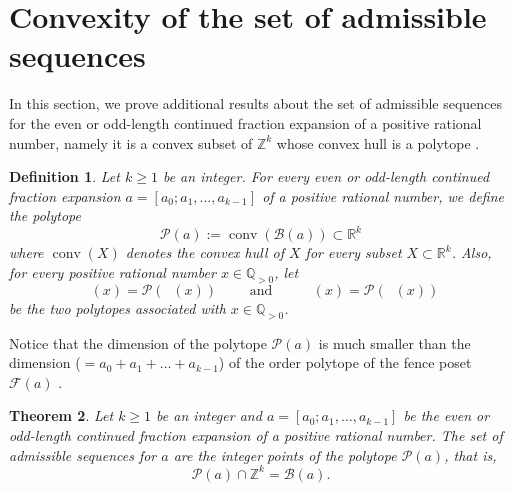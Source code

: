 \documentclass[a4paper,12pt]{amsart}
\newtheorem{definition}{Definition}[section]
\newtheorem{theorem}[definition]{Theorem}
\newcommand{\Z}{\mathbb{Z}}
\newcommand{\Q}{\mathbb{Q}}
\newcommand{\R}{\mathbb{R}}
\newcommand{\xx}{{x}}
\newcommand{\Bcal}{{\mathcal{B}}}
\newcommand{\Fcal}{{\mathcal{F}}}
\newcommand{\Pcal}{{\mathcal{P}}}
\newcommand{\0}{\mathtt{0}}
\newcommand{\1}{\mathtt{1}}
\newcommand{\2}{\mathtt{2}}
\newcommand{\3}{\mathtt{3}}
\DeclareMathOperator{\Pcaleven}{{\Pcal_{\text{even}}}}
\DeclareMathOperator{\Pcalodd}{{\Pcal_{\text{odd}}}}
\DeclareMathOperator{\CFeven}{{CF_{\text{even}}}}
\DeclareMathOperator{\CFodd}{{CF_{\text{odd}}}}
\DeclareMathOperator{\conv}{conv}
\begin{document}
%
%
%
%
%
%
%
%
%
%
%
%
%





\section{Convexity of the set of admissible sequences}
\label{sec:convexity}

In this section, we prove additional results about the set
of admissible sequences for the even or odd-length continued
fraction expansion of a positive rational number,
namely it is a convex subset of $\Z^k$
whose convex hull is a polytope \cite{MR1311028}.

\begin{definition}
    Let $k\geq 1$ be an integer.
    For every even or odd-length continued fraction expansion
    $a=[a_0; a_1, \dots, a_{k-1}]$ of a positive rational number,
    we define the polytope
    \[
        \Pcal(a):=\conv(\Bcal(a))\subset\R^{k}
    \]
    where $\conv(X)$ denotes the convex hull of $X$ for every subset
    $X\subset\R^k$.
Also, for every positive rational number $\xx\in\Q_{>0}$,
let
\[
    \Pcaleven(x)=\Pcal(\CFeven(x))
    \qquad
    \text{ and }
    \qquad
    \Pcalodd(x)=\Pcal(\CFodd(x))
\]
be the two polytopes associated with $x\in\Q_{>0}$.
\end{definition}

Notice that the dimension of the polytope $\Pcal(a)$
is much smaller than the dimension ($=a_0+a_1+\dots+a_{k-1}$)
of the order polytope of the fence poset $\Fcal(a)$
\cite{zbMATH03958127}.

%
%
%
%


\begin{theorem}\label{thm:convex-hull}
    Let $k\geq 1$ be an integer
    and $a=[a_0; a_1, \dots, a_{k-1}]$ be the even or odd-length continued
    fraction expansion of a positive rational number.
    The set of admissible sequences for $a$
    are the integer points of the polytope $\Pcal(a)$, that is,
    \[
        \Pcal(a)\cap\Z^k = \Bcal(a).
    \]
\end{theorem}
\end{document}
